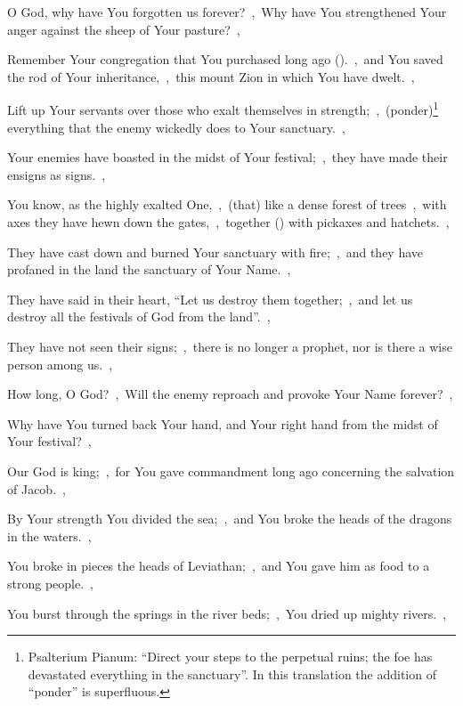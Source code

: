 \documentclass[12pt,twoside,a5paper]{article}
\begin{document}
\begin{normalparskip}
  O God, why have You forgotten us forever?~\sep\ Why have You strengthened Your anger against the sheep of Your pasture?~\sep


  Remember Your congregation that You purchased long ago ().~\sep\ and You saved the rod of Your inheritance,~\sep\ this mount Zion in which You have dwelt.~\sep

  Lift up Your servants over those who exalt themselves in strength;~\sep\ (ponder)\footnote{Psalterium Pianum: ``Direct your steps to the perpetual ruins; the foe has devastated everything in the sanctuary''. In this translation the addition of ``ponder'' is superfluous.} everything that the enemy wickedly does to Your sanctuary.~\sep

  Your enemies have boasted in the midst of Your festival;~\sep\ they have made their ensigns as signs.~\sep

  You know, as the highly exalted One,~\sep\ (that) like a dense forest of trees~\sep\ with axes they have hewn down the gates,~\sep\ together () with pickaxes and hatchets.~\sep

  They have cast down and burned Your sanctuary with fire;~\sep\ and they have profaned in the land the sanctuary of Your Name.~\sep

  They have said in their heart, ``Let us destroy them together;~\sep\ and let us destroy all the festivals of God from the land''.~\sep

  They have not seen their signs;~\sep\ there is no longer a prophet, nor is there a wise person among us.~\sep

  How long, O God?~\sep\ Will the enemy reproach and provoke Your Name forever?~\sep

  Why have You turned back Your hand, and Your right hand from the midst of Your festival?~\sep

  Our God is king;~\sep\ for You gave commandment long ago concerning the salvation of Jacob.~\sep

  By Your strength You divided the sea;~\sep\ and You broke the heads of the dragons in the waters.~\sep

  You broke in pieces the heads of Leviathan;~\sep\ and You gave him as food to a strong people.~\sep

  You burst through the springs in the river beds;~\sep\ You dried up mighty rivers.~\sep


\end{normalparskip}
\end{document}
